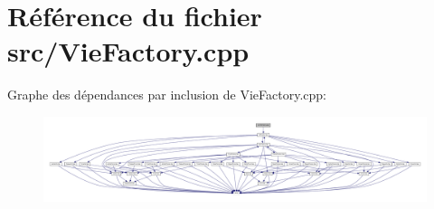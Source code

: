 \section{Référence du fichier src/\-Vie\-Factory.cpp}
\label{_vie_factory_8cpp}
Graphe des dépendances par inclusion de Vie\-Factory.\-cpp\-:\nopagebreak
\begin{figure}[H]
\begin{center}
\leavevmode
\includegraphics[width=350pt]{_vie_factory_8cpp__incl}
\end{center}
\end{figure}
